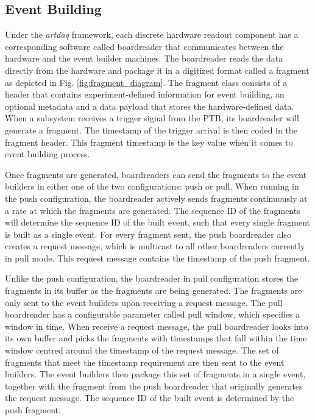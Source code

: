 \subsection{Event Building}

Under the \textit{artdaq} framework, each discrete hardware readout component has a corresponding software called boardreader that communicates between the hardware and the event builder machines.
The boardreader reads the data directly from the hardware and package it in a digitized format called a fragment as depicted in Fig. \ref{fig:fragment_diagram}. 
The fragment class consists of a header that contains experiment-defined information for event building, an optional metadata and a data payload that stores the hardware-defined data. 
When a subsystem receives a trigger signal from the PTB, its boardreader will generate a fragment.
The timestamp of the trigger arrival is then coded in the fragment header.
This fragment timestamp is the key value when it comes to event building process.

Once fragments are generated, boardreaders can send the fragments to the event builders in either one of the two configurations: push or pull. 
When running in the push configuration, the boardreader actively sends fragments continuously at a rate at which the fragments are generated.
The sequence ID of the fragments will determine the sequence ID of the built event, such that every single fragment is built as a single event.
For every fragment sent, the push boardreader also creates a request message, which is multicast to all other boardreaders currently in pull mode.
This request message contains the timestamp of the push fragment. 

Unlike the push configuration, the boardreader in pull configuration stores the fragments in its buffer as the fragments are being generated.
The fragments are only sent to the event builders upon receiving a request message.
The pull boardreader has a configurable parameter called pull window, which specifies a window in time.
When receive a request message, the pull boardreader looks into its own buffer and picks the fragments with timestamps that fall within the time window centred around the timestamp of the request message.
The set of fragments that meet the timestamp requirement are then sent to the event builders.
The event builders then package this set of fragments in a single event, together with the fragment from the push boardreader that originally generates the request message.
The sequence ID of the built event is determined by the push fragment.

